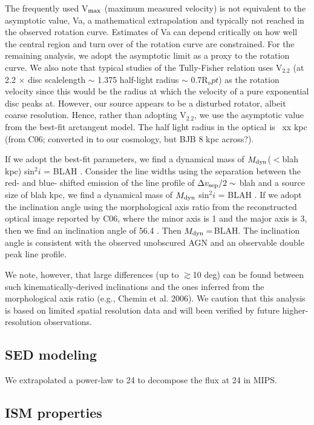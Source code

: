 \documentclass[]{emulateapj}
\begin{document}
The frequently used V$_{\rm max}$ (maximum measured velocity) is not equivalent to the
asymptotic value, Va, a mathematical extrapolation and typically not reached in
the observed rotation curve. Estimates of Va can depend critically on how well
the central region and turn over of the rotation curve are constrained. For the
remaining analysis, we adopt the asymptotic limit as a proxy to the rotation
curve. We also note that typical studies of the Tully-Fisher relation uses V$_2.2$ (at 2.2 $\times$ disc scalelength $\sim$ 1.375 half-light radius $\sim$ 0.7R$_opt$) as the rotation
velocity since this would be the radius at which the velocity of a pure
exponential disc peaks at. However, our source appears to be a disturbed
rotator, albeit coarse resolution. Hence, rather than adopting V$_2.2$, we use the
asymptotic value from the best-fit arctangent model. The half light radius in the
optical is ~xx kpc (from C06; converted in to our cosmology, but BJB 8 kpc
across?).

If we adopt the best-fit parameters, we find a dynamical mass of $M_{\rm dyn}$($<$blah kpc) sin$^2 i$ = BLAH \Msun. Consider the line widths using the separation between
the red- and blue- shifted emission of the \bco line profile of $\Delta v_{\rm sep}/2 \sim$ blah \kms and a source size of blah kpc, we find a dynamical mass of $M_{\rm dyn}$
sin$^2 i$ = BLAH \Msun. If we adopt the inclination angle using the morphological axis ratio from the
reconstructed optical image reported by C06, where the minor axis is 1 and the major axis is 3, then we find an inclination angle of 56.4
\degr. Then $M_{\rm dyn}$\,=\,BLAH. The inclination angle is consistent with the observed unobscured AGN and an observable double peak line profile.

We note, however, that large differences (up to $\gtrsim$10 deg) can be found between such kinematically-derived inclinations and the ones inferred from the morphological
axis ratio (e.g., Chemin et al. 2006). We caution that this analysis is based on limited spatial resolution data and will been verified by future higher-resolution observations.

\subsection{SED modeling}

We extrapolated a power-law to 24 \micron
to decompose the flux at 24 \micron in MIPS.

\subsection{ISM properties}
\end{document}
